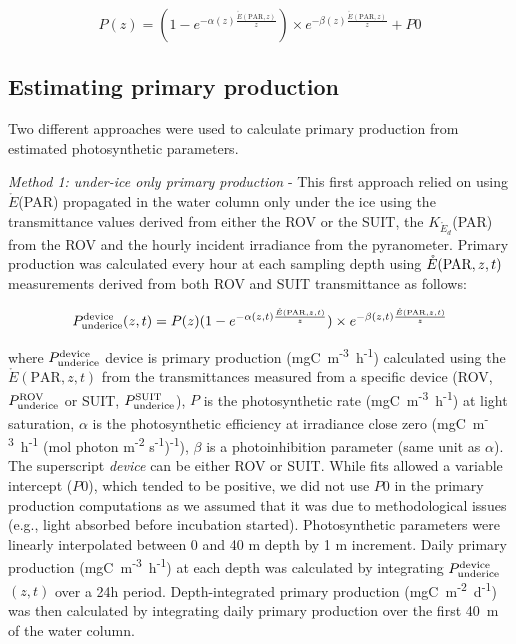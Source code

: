\documentclass[draft]{agujournal2018}
\newcommand{\kdparscalar}{\ensuremath{K_{\mathring{E}_d}}(\textnormal{PAR})}
\newcommand{\eparscalar}{\ensuremath{\mathring{E}}(\textnormal{PAR})}
\newcommand{\ppundericedevice}{\ensuremath{P_{\textnormal{\scriptsize underice}}^{\textnormal{\scriptsize device}}}}
\newcommand{\ppsuitunderice}{\ensuremath{P_{\textnormal{\scriptsize underice}}^{\textnormal{\scriptsize SUIT}}}}
\newcommand{\pprovunderice}{\ensuremath{P_{\textnormal{\scriptsize underice}}^{\textnormal{\scriptsize ROV}}}}
\newcommand{\dailypp}{mgC~m\textsuperscript{-2}~d\textsuperscript{-1}}
\begin{document}
\begin{linenomath*}
	\begin{equation}
P(z) = (1 - e^{-\alpha(z)\frac{\mathring{E}(\text{PAR}, z)}{z}}) \times e^{-\beta(z)\frac{\mathring{E}(\text{PAR}, z)}{z}} + P0
\end{equation}
\end{linenomath*}



\subsection{Estimating primary production}

Two different approaches were used to calculate primary production from estimated photosynthetic parameters.

\textit{Method 1: under-ice only primary production} - This first approach relied on using \eparscalar{} propagated in the water column only under the ice using the transmittance values derived from either the ROV or the SUIT, the \kdparscalar{} from the ROV and the hourly incident irradiance from the pyranometer. Primary production was calculated every hour at each sampling depth using $\mathring{E}(\textnormal{PAR}, z, t)$ measurements derived from both ROV and SUIT transmittance as follows:

\begin{linenomath*}
    \begin{equation}
		\ppundericedevice{}(z,t) = P(z)(1 - e^{-\alpha(z,t)\frac{\mathring{E}(\text{PAR}, z, t)}{z}}) \times e^{-\beta(z,t)\frac{\mathring{E}(\text{PAR}, z, t)}{z}}
	\end{equation}
\end{linenomath*}

\noindent where \ppundericedevice{} device is primary production (mgC~m\textsuperscript{-3}~h\textsuperscript{-1}) calculated using the $\mathring{E}(\text{PAR}, z, t)$ from the transmittances measured from a specific device (ROV, \pprovunderice{} or SUIT, \ppsuitunderice{}), $P$ is the photosynthetic rate (mgC~m\textsuperscript{-3}~h\textsuperscript{-1}) at light saturation, $\alpha$ is the photosynthetic efficiency at irradiance close zero (mgC~m\textsuperscript{-3}~h\textsuperscript{-1} (\textmu mol photon m\textsuperscript{-2} s\textsuperscript{-1})\textsuperscript{-1}), $\beta$ is a photoinhibition parameter (same unit as $\alpha$). The superscript \textit{device} can be either ROV or SUIT. While fits allowed a variable intercept ($P0$), which tended to be positive, we did not use $P0$ in the primary production computations as we assumed that it was due to methodological issues (e.g., light absorbed before incubation started). Photosynthetic parameters were linearly interpolated between 0 and 40 m depth by 1 m increment. Daily primary production (mgC~m\textsuperscript{-3}~h\textsuperscript{-1}) at each depth was calculated by integrating \ppundericedevice{}$(z,t)$ over a 24h period. Depth-integrated primary production (\dailypp{}) was then calculated by integrating daily primary production over the first 40~m of the water column.
\end{document}
